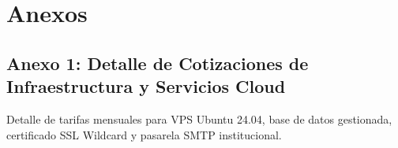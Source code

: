 \documentclass[12pt,a4paper]{article}
\begin{document}
\vspace{0.4cm}

\section{Anexos}
\subsection*{Anexo 1: Detalle de Cotizaciones de Infraestructura y Servicios Cloud}
Detalle de tarifas mensuales para VPS Ubuntu 24.04, base de datos gestionada, certificado SSL Wildcard y pasarela SMTP institucional.
\end{document}
